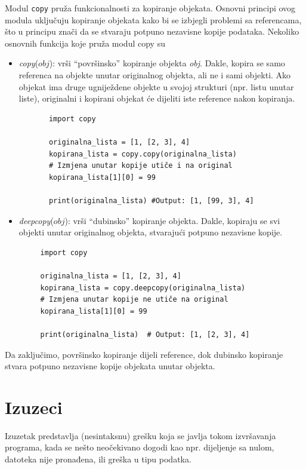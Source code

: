   Modul \texttt{copy} pruža funkcionalnosti za kopiranje objekata. Osnovni principi ovog modula uključuju kopiranje objekata kako bi se izbjegli problemi sa referencama, što u principu znači da se stvaraju potpuno nezavisne kopije podataka. Nekoliko osnovnih funkcija koje pruža modul copy su 
  \begin{itemize}
  	\item \emph{copy}($obj$): vrši ``površinsko''  kopiranje objekta \emph{obj}. Dakle, kopira se samo referenca na objekte unutar originalnog objekta, ali ne i sami objekti. Ako objekat ima druge ugniježdene objekte u svojoj strukturi (npr. listu unutar liste), originalni i kopirani objekat će dijeliti iste reference nakon kopiranja. 
  	\begin{verbatim}
  	   import copy
  	   
  	   originalna_lista = [1, [2, 3], 4]
  	   kopirana_lista = copy.copy(originalna_lista)
  	   # Izmjena unutar kopije utiče i na original
  	   kopirana_lista[1][0] = 99
  	  
  	   print(originalna_lista) #Output: [1, [99, 3], 4]
  	\end{verbatim}
  
  
  	\item \emph{deepcopy}($obj$): vrši ``dubinsko'' kopiranje objekta. Dakle, kopiraju se svi objekti unutar originalnog objekta, stvarajući potpuno nezavisne kopije.
  	
 \begin{verbatim}
 	 import copy
 	 
 	 originalna_lista = [1, [2, 3], 4]
 	 kopirana_lista = copy.deepcopy(originalna_lista)
 	 # Izmjena unutar kopije ne utiče na original
 	 kopirana_lista[1][0] = 99
 	 
 	 print(originalna_lista)  # Output: [1, [2, 3], 4]
 \end{verbatim}
  \end{itemize}
  
  Da zaključimo, površinsko kopiranje dijeli reference, dok dubinsko kopiranje stvara potpuno nezavisne kopije objekata unutar objekta.
  

\section{Izuzeci}

Izuzetak predstavlja (nesintaksnu) grešku koja se javlja tokom izvršavanja programa, kada se nešto neočekivano dogodi kao npr. dijeljenje sa nulom, datoteka nije pronađena, ili greška u tipu podatka.

